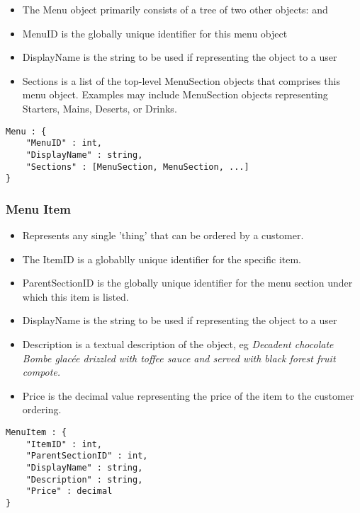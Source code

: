 \documentclass[12pt, a4paper]{article}
\begin{document}
\begin{itemize}
\item The Menu object primarily consists of a tree of two other objects:  and 

\item MenuID is the globally unique identifier for this menu object

\item DisplayName is the string to be used if representing the object to a user

\item Sections is a list of the top-level MenuSection objects that comprises this menu object. Examples may include MenuSection objects representing Starters, Mains, Deserts, or Drinks.
\end{itemize}

\begin{verbatim}
Menu : {
	"MenuID" : int,
	"DisplayName" : string,
	"Sections" : [MenuSection, MenuSection, ...]
}
\end{verbatim}


\subsubsection{Menu Item} \label{subsubsec:MenuItem}

\begin{itemize}
\item Represents any single 'thing' that can be ordered by a customer.
\item The ItemID is a globablly unique identifier for the specific item.
\item ParentSectionID is the globally unique identifier for the menu section under which this item is listed.
\item DisplayName is the string to be used if representing the object to a user
\item Description is a textual description of the object, eg \textit{Decadent chocolate Bombe glacée drizzled with toffee sauce and served with black forest fruit compote.}
\item Price is the decimal value representing the price of the item to the customer ordering.
\end{itemize}

\begin{verbatim}
MenuItem : {
	"ItemID" : int,
	"ParentSectionID" : int,
	"DisplayName" : string,
	"Description" : string,
	"Price" : decimal
}
\end{verbatim}
\end{document}
